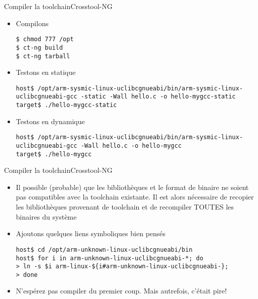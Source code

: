 \begin{frame}[fragile=singleslide]{Compiler la toolchain}{Crosstool-NG}
  \begin{itemize}
     \item Compilons
       \begin{lstlisting}
$ chmod 777 /opt
$ ct-ng build
$ ct-ng tarball
       \end{lstlisting}
     \item Testons en statique
       \begin{lstlisting}[basicstyle=\ttfamily\scriptsize\color{colBasic}]
host$ /opt/arm-sysmic-linux-uclibcgnueabi/bin/arm-sysmic-linux-uclibcgnueabi-gcc -static -Wall hello.c -o hello-mygcc-static
target$ ./hello-mygcc-static
       \end{lstlisting}
     \item Testons en dynamique
       \begin{lstlisting}[basicstyle=\ttfamily\scriptsize\color{colBasic}]
host$ /opt/arm-sysmic-linux-uclibcgnueabi/bin/arm-sysmic-linux-uclibcgnueabi-gcc -Wall hello.c -o hello-mygcc
target$ ./hello-mygcc
       \end{lstlisting}
  \end{itemize}
\end{frame}

\begin{frame}[fragile=singleslide]{Compiler la toolchain}{Crosstool-NG}
  \begin{itemize}
      \item Il  possible (probable) que les bibliothèques  et le format
        de  binaire  ne  soient   pas  compatibles  avec  la  toolchain
        existante.    Il  est   alors  nécessaire   de   recopier  les
        bibliothèques  provenant de toolchain  et de  recompiler TOUTES
        les binaires du système
      \item Ajoutons quelques liens symboliques bien pensés
       \begin{lstlisting}[basicstyle=\ttfamily\scriptsize\color{colBasic}]
host$ cd /opt/arm-unknown-linux-uclibcgnueabi/bin
host$ for i in arm-unknown-linux-uclibcgnueabi-*; do
> ln -s $i arm-linux-${i#arm-unknown-linux-uclibcgnueabi-};
> done
       \end{lstlisting}
      \item N'espérez  pas compiler  du premier coup.  Mais autrefois,
        c'était pire!
      \end{itemize}
\end{frame}

